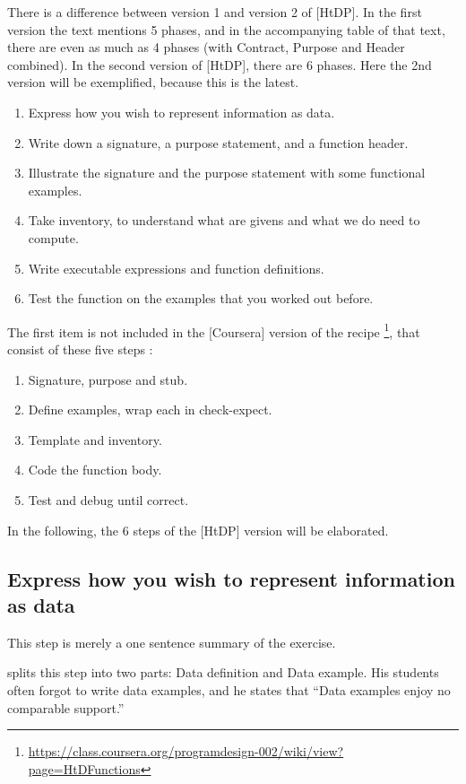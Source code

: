 There is a difference between version 1 and version 2 of [HtDP].
In the first version the text mentions 5 phases, and in the accompanying table
of that text, there are even as much as 4 phases (with Contract, Purpose and Header combined).
In the second version of [HtDP], there are 6 phases.
Here the 2nd version will be exemplified, because this is the latest.

\begin{enumerate}
 \item Express how you wish to represent information as data.
 \item Write down a signature, a purpose statement, and a function header.
 \item Illustrate the signature and the purpose statement with some functional examples.
 \item Take inventory, to understand what are givens and what we do need to compute.
 \item Write executable expressions and function definitions.
 \item Test the function on the examples that you worked out before.
\end{enumerate}
 
 The first item is not included in the [Coursera] version of the recipe \footnote{\url{https://class.coursera.org/programdesign-002/wiki/view?page=HtDFunctions}}, that consist of these five steps :
 
\begin{enumerate}
  \item Signature, purpose and stub.
  \item Define examples, wrap each in check-expect.
  \item Template and inventory.
  \item Code the function body.
  \item Test and debug until correct.
\end{enumerate}

In the following, the 6 steps of the [HtDP] version will be elaborated.



\subsection{Express how you wish to represent information as data}
This step is merely a one sentence summary of the exercise.

\citep{ramsey_teaching_2015} splits this step into two parts: Data definition
and Data example. His students often forgot to write data examples, and he states that
``Data examples enjoy no comparable support.''

